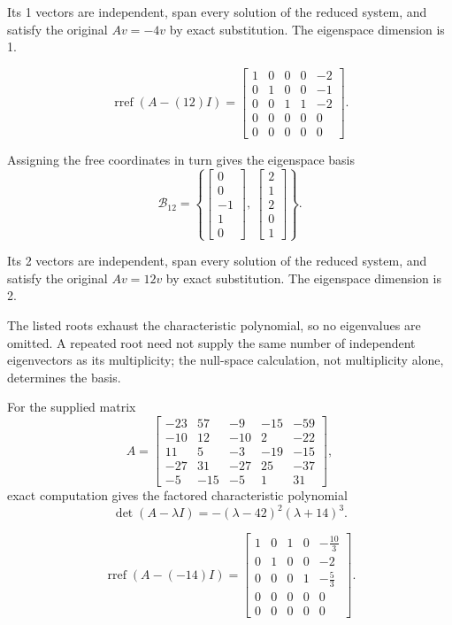 Its 1 vectors are independent, span every solution of the reduced system, and satisfy the original $Av=-4v$ by exact substitution. The eigenspace dimension is 1.

\[ \operatorname{rref}(A-(12)I)=\begin{bmatrix}1 & 0 & 0 & 0 & -2\\0 & 1 & 0 & 0 & -1\\0 & 0 & 1 & 1 & -2\\0 & 0 & 0 & 0 & 0\\0 & 0 & 0 & 0 & 0\end{bmatrix}.\]

Assigning the free coordinates in turn gives the eigenspace basis
\[ \mathcal B_{12}=\left\{\begin{bmatrix}0\\0\\-1\\1\\0\end{bmatrix},\ \begin{bmatrix}2\\1\\2\\0\\1\end{bmatrix}\right\}.\]

Its 2 vectors are independent, span every solution of the reduced system, and satisfy the original $Av=12v$ by exact substitution. The eigenspace dimension is 2.

The listed roots exhaust the characteristic polynomial, so no eigenvalues are omitted. A repeated root need not supply the same number of independent eigenvectors as its multiplicity; the null-space calculation, not multiplicity alone, determines the basis.

For the supplied matrix
\[ A=\begin{bmatrix}-23 & 57 & -9 & -15 & -59\\-10 & 12 & -10 & 2 & -22\\11 & 5 & -3 & -19 & -15\\-27 & 31 & -27 & 25 & -37\\-5 & -15 & -5 & 1 & 31\end{bmatrix},\]
exact computation gives the factored characteristic polynomial
\[ \det(A-\lambda I)=- \left(\lambda - 42\right)^{2} \left(\lambda + 14\right)^{3}.\]

\[ \operatorname{rref}(A-(-14)I)=\begin{bmatrix}1 & 0 & 1 & 0 & - \frac{10}{3}\\0 & 1 & 0 & 0 & -2\\0 & 0 & 0 & 1 & - \frac{5}{3}\\0 & 0 & 0 & 0 & 0\\0 & 0 & 0 & 0 & 0\end{bmatrix}.\]

